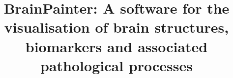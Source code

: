 \documentclass{llncs}
\begin{document}
\title{BrainPainter: A software for the visualisation of brain structures, biomarkers and associated pathological processes}
%
%


\author{}

\authorrunning{} %

\institute{}



\maketitle              %


\newcommand{\expFld}{.}
\end{document}
